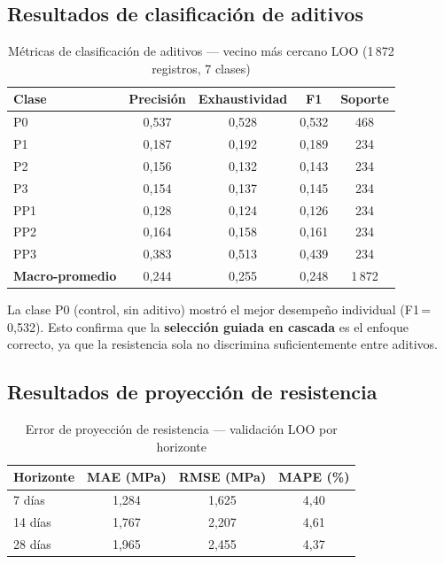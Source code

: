 \documentclass[12pt, letterpaper]{article}
\begin{document}
\subsection{Resultados de clasificación de aditivos}

\begin{table}[H]
  \centering
  \caption{Métricas de clasificación de aditivos --- vecino más cercano LOO (1\,872 registros, 7 clases)}
  \begin{tabular}{lcccc}
    \hline
    Clase & Precisión & Exhaustividad & F1 & Soporte \\
    \hline
    P0  & 0{,}537 & 0{,}528 & 0{,}532 & 468 \\
    P1  & 0{,}187 & 0{,}192 & 0{,}189 & 234 \\
    P2  & 0{,}156 & 0{,}132 & 0{,}143 & 234 \\
    P3  & 0{,}154 & 0{,}137 & 0{,}145 & 234 \\
    PP1 & 0{,}128 & 0{,}124 & 0{,}126 & 234 \\
    PP2 & 0{,}164 & 0{,}158 & 0{,}161 & 234 \\
    PP3 & 0{,}383 & 0{,}513 & 0{,}439 & 234 \\
    \textbf{Macro-promedio} & 0{,}244 & 0{,}255 & 0{,}248 & 1\,872 \\
    \hline
  \end{tabular}
\end{table}

La clase P0 (control, sin aditivo) mostró el mejor desempeño individual (F1\,=\,0{,}532). Esto confirma que la \textbf{selección guiada en cascada} es el enfoque correcto, ya que la resistencia sola no discrimina suficientemente entre aditivos.

\subsection{Resultados de proyección de resistencia}

\begin{table}[H]
  \centering
  \caption{Error de proyección de resistencia --- validación LOO por horizonte}
  \begin{tabular}{lccc}
    \hline
    Horizonte & MAE (MPa) & RMSE (MPa) & MAPE (\%) \\
    \hline
    7 días  & 1{,}284 & 1{,}625 & 4{,}40 \\
    14 días & 1{,}767 & 2{,}207 & 4{,}61 \\
    28 días & 1{,}965 & 2{,}455 & 4{,}37 \\
    \hline
  \end{tabular}
\end{table}
\end{document}
